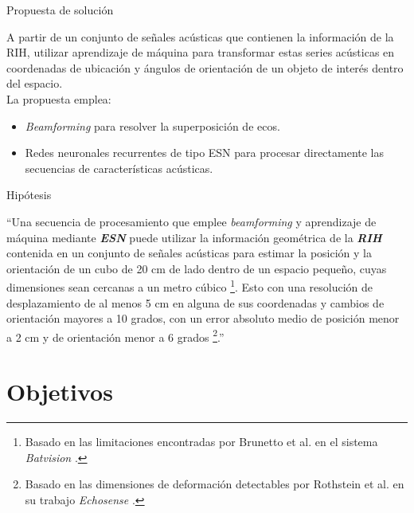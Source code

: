 \documentclass[aspectratio=169]{beamer}
\begin{document}
\begin{frame}{Propuesta de solución}

    A partir de un conjunto de señales acústicas que contienen la información de la RIH, utilizar aprendizaje de máquina para transformar estas series acústicas en coordenadas de ubicación y ángulos de orientación de un objeto de interés dentro del espacio.\\
    La propuesta emplea:
        \begin{itemize}%
        \item \textit{Beamforming} para resolver la superposición de ecos.
        \item Redes neuronales recurrentes de tipo ESN para procesar directamente las secuencias de características acústicas.
        \end{itemize}
        
\end{frame}

\begin{frame}{Hipótesis}

 ``Una secuencia de procesamiento que emplee \textit{beamforming} y aprendizaje de máquina mediante \textit{\textbf{ESN}} puede utilizar la información geométrica de la \textit{\textbf{RIH}} contenida en un conjunto de señales acústicas para estimar la posición y la orientación de un cubo de 20 cm de lado dentro de un espacio pequeño, cuyas dimensiones sean cercanas a un metro cúbico \footnote{Basado en las limitaciones encontradas por Brunetto et al. en el sistema \textit{Batvision} \cite{bat1}.}. Esto con una resolución de desplazamiento de al menos 5 cm en alguna de sus coordenadas y cambios de orientación mayores a 10 grados, con un error absoluto medio de posición menor a 2 cm y de orientación menor a 6 grados \footnote{Basado en las dimensiones de deformación detectables por Rothstein et al. en su trabajo \textit{Echosense} \cite{echosense}.}.''

\end{frame}





\section{Objetivos}

\begin{frame}{}
\end{frame}
\end{document}
